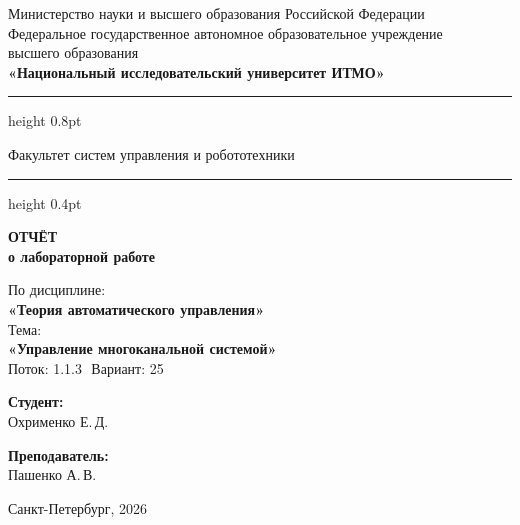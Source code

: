 \documentclass[a4paper,12pt]{article}
\begin{document}
	
	\begin{titlepage}
		\centering
		
		\vspace*{0.5cm}
		{\small
			Министерство науки и высшего образования Российской Федерации\\[2pt]
			Федеральное государственное автономное образовательное учреждение\\
			высшего образования\\[2pt]
			\textbf{«Национальный исследовательский университет ИТМО»}\\
		}
		
		\vspace{0.8cm}
		\hrule height 0.8pt
		\vspace{0.3cm}
		
		{\large Факультет систем управления и робототехники}
		
		\vspace{0.3cm}
		\hrule height 0.4pt
		\vspace{2.5cm}
		
		{\Huge\bfseries ОТЧЁТ}\\[0.4cm]
		{\LARGE\bfseries о лабораторной работе}\\[0.8cm]
		
		\begin{tcolorbox}[
			colback=gray!4,
			colframe=gray!10,
			boxrule=0.8pt,
			arc=4pt,
			left=12pt, right=12pt, top=8pt, bottom=8pt
			]
			\centering
			{\large По дисциплине:\\[4pt]}
			{\large\bfseries «Теория автоматического управления»}\\[10pt]
			{\large Тема:\\[4pt]}
			{\large\bfseries «Управление многоканальной системой»} \\[10pt]
			{\large Поток: 1.1.3 \( \) Вариант: 25}
		\end{tcolorbox}
		
		\vspace{3cm}
		
		\begin{minipage}{0.45\textwidth}
			\raggedright
			{\large\bfseries Студент:}\\[4pt]
			Охрименко Е.\,Д.\\
		\end{minipage}
		\hfill
		\begin{minipage}{0.45\textwidth}
			\raggedleft
			{\large\bfseries Преподаватель:}\\[4pt]
			Пашенко А.\,В.\\
		\end{minipage}
		
		\vfill
		\vspace{0.4cm}
		{\large Санкт-Петербург, 2026}
	\end{titlepage}
	
\end{document}
